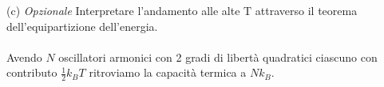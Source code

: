 \documentclass[a4paper]{article}
\begin{document}
        \begin{center}
        \end{center}
        (c) \emph{Opzionale} Interpretare l'andamento alle alte T attraverso il teorema dell'equipartizione dell'energia.
        \\
        \\
        Avendo $N$ oscillatori armonici con 2 gradi di libertà quadratici ciascuno con contributo $\frac{1}{2}k_BT$ ritroviamo la capacità termica a $Nk_B$.
\end{document}
